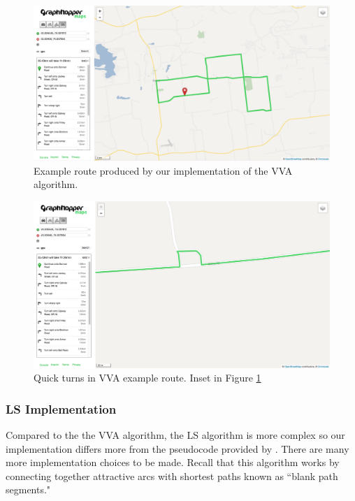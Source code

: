 \documentclass[honors]{union-cs-thesis}
\begin{document}
\begin{figure}
    \begin{center}
        \includegraphics[width=\textwidth]{figs/vva-route}
    \end{center}
    \caption{Example route produced by our implementation of the VVA algorithm.}
    \label{fig:vva-example}
\end{figure}

\begin{figure}
    \begin{center}
        \includegraphics[width=\textwidth]{figs/vva-route-turn}
    \end{center}
    \caption{Quick turns in VVA example route. Inset in Figure \ref{fig:vva-example}}
    \label{fig:vva-example-turn}
\end{figure}


\subsubsection{LS Implementation}
Compared to the the VVA algorithm, the LS algorithm is more complex so our implementation differs more from the pseudocode provided by \citeauthor{lu2015arc}. There are many more implementation choices to be made. Recall that this algorithm works by connecting together attractive arcs with shortest paths known as ``blank path segments." 
\end{document}
